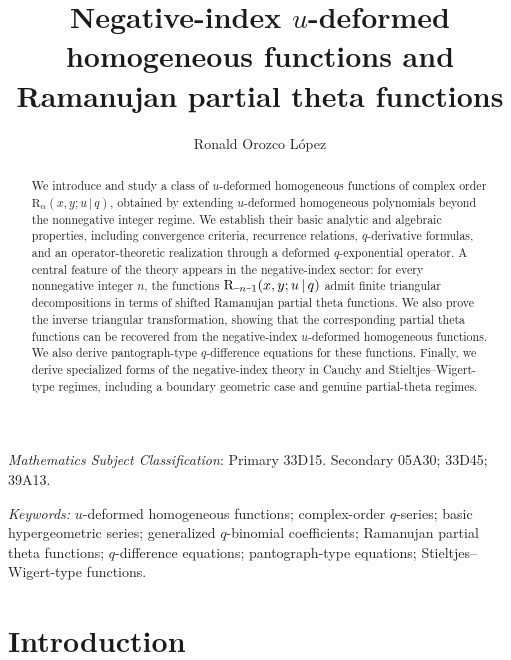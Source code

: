 \documentclass[12pt]{article}
\newcommand{\minus}{\textup{\texttt{-}}}
\newcommand{\rr}{\mathrm{R}}
\begin{document}
\title{\textbf{Negative-index $u$-deformed homogeneous functions and Ramanujan partial theta functions}}
\author{Ronald Orozco L\'opez}
\newcommand{\Addresses}{{%
  \bigskip
  \footnotesize

  \textit{E-mail address}, R.~Orozco: \texttt{rj.orozco@uniandes.edu.co}
  
}}


\maketitle

\begin{abstract}
We introduce and study a class of \(u\)-deformed homogeneous functions of complex order \(\rr_{\alpha}(x,y;u\,|\,q)\), obtained by extending \(u\)-deformed homogeneous polynomials beyond the nonnegative integer regime. We establish their basic analytic and algebraic properties, including convergence criteria, recurrence relations, \(q\)-derivative formulas, and an operator-theoretic realization through a deformed \(q\)-exponential operator. A central feature of the theory appears in the negative-index sector: for every nonnegative integer \(n\), the functions \(\rr_{\minus n\minus1}(x,y;u\,|\,q)\) admit finite triangular decompositions in terms of shifted Ramanujan partial theta functions. We also prove the inverse triangular transformation, showing that the corresponding partial theta functions can be recovered from the negative-index \(u\)-deformed homogeneous functions. We also derive pantograph-type \(q\)-difference equations for these functions. Finally, we derive specialized forms of the negative-index theory in Cauchy and Stieltjes--Wigert-type regimes, including a boundary geometric case and genuine partial-theta regimes.
\end{abstract}
 {\it Mathematics Subject Classification}:
Primary 33D15. Secondary 05A30; 33D45; 39A13.

\noindent \emph{Keywords: } \(u\)-deformed homogeneous functions; complex-order \(q\)-series; basic hypergeometric series; generalized \(q\)-binomial coefficients; Ramanujan partial theta functions; \(q\)-difference equations; pantograph-type equations; Stieltjes--Wigert-type functions.


\section{Introduction}
\end{document}
